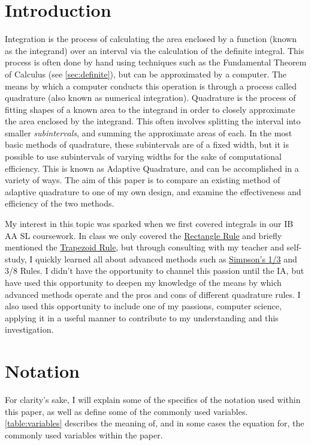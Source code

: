 \documentclass{paper}
\begin{document}
\insertTitlePage
{}
\tableofcontents
\thispagestyle{frontorback}
\newpage
\setcounter{page}{1}
\justifying

\section{Introduction}
\label{sec:intro}
Integration is the process of calculating the area enclosed by a function (known as the integrand) over an interval via the calculation of the definite integral.
This process is often done by hand using techniques such as the Fundamental Theorem of Calculus (see \cref{sec:definite}), but can be approximated by a computer.
The means by which a computer conducts this operation is through a process called quadrature (also known as numerical integration).
Quadrature is the process of fitting shapes of a known area to the integrand in order to closely approximate the area enclosed by the integrand.
This often involves splitting the interval into smaller \textit{subintervals}, and summing the approximate areas of each.
In the most basic methods of quadrature, these subintervals are of a fixed width, but it is possible to use subintervals of varying widths for the sake of computational efficiency.
This is known as Adaptive Quadrature, and can be accomplished in a variety of ways.
The aim of this paper is to compare an existing method of adaptive quadrature to one of my own design, and examine the effectiveness and efficiency of the two methods.

My interest in this topic was sparked when we first covered integrals in our IB AA SL coursework.
In class we only covered the \hyperref[sec:rect_rule]{Rectangle Rule} and briefly mentioned the \hyperref[sec:trap_rule]{Trapezoid Rule}, but through consulting with my teacher and self-study, I quickly learned all about advanced methods such as \hyperref[sec:smps_rule]{Simpson's 1/3} and 3/8 Rules.
I didn't have the opportunity to channel this passion until the IA, but have used this opportunity to deepen my knowledge of the means by which advanced methods operate and the pros and cons of different quadrature rules.
I also used this opportunity to include one of my passions, computer science, applying it in a useful manner to contribute to my understanding and this investigation.

\section{Notation}
\label{sec:notation}
For clarity's sake, I will explain some of the specifics of the notation used within this paper, as well as define some of the commonly used variables.
\cref{table:variables} describes the meaning of, and in some cases the equation for, the commonly used variables within the paper.
\end{document}
